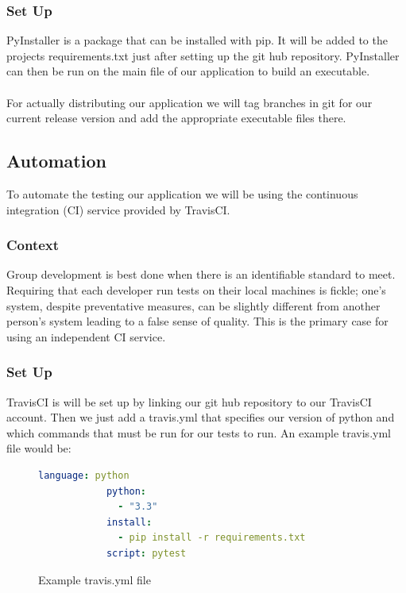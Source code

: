 \documentclass[onecolumn, draftclsnofoot,10pt, compsoc]{IEEEtran}
\begin{document}
\subsubsection{Set Up}

PyInstaller is a package that can be installed with pip. It will be added to the projects requirements.txt just after setting up the git hub repository. PyInstaller can then be run on the main file of our application to build an executable.
\\\\
\noindent
For actually distributing our application we will tag branches in git for our current release version and add the appropriate executable files there. 
\subsection{Automation}

To automate the testing our application we will be using the continuous integration (CI) service provided by TravisCI.

\subsubsection{Context}

Group development is best done when there is an identifiable standard to meet. Requiring that each developer run tests on their local machines is fickle; one's system, despite preventative measures, can be slightly different from another person's system leading to a false sense of quality. This is the primary case for using an independent CI service.    

\subsubsection{Set Up}
 
 TravisCI is will be set up by linking our git hub repository to our TravisCI account. Then we just add a travis.yml that specifies our version of python and which commands that must be run for our tests to run. An example travis.yml file would be:
 
 \begin{figure}[H]
     \centering
         \begin{lstlisting}[language=yml]
            language: python
            python:
              - "3.3"
            install:
              - pip install -r requirements.txt
            script: pytest
        \end{lstlisting}
     \caption{Example travis.yml file}
     \label{fig:travis-ci}
 \end{figure}{}
\end{document}
